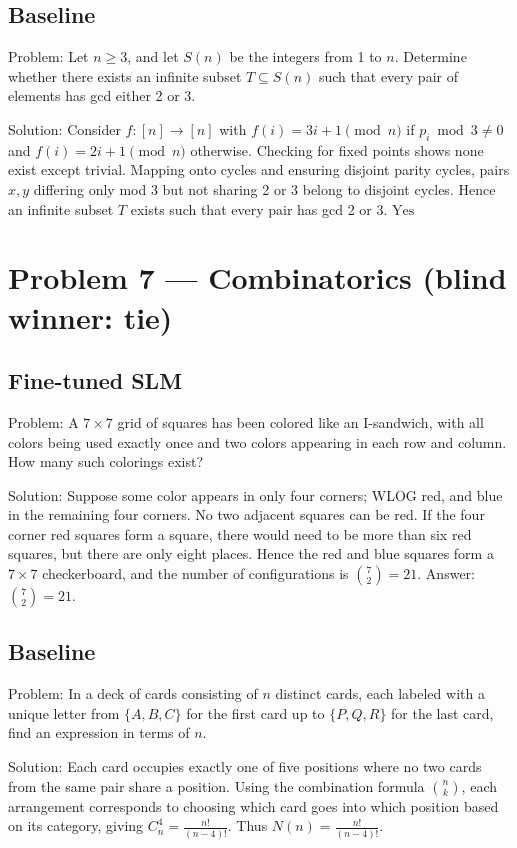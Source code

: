 \documentclass[11pt]{article}
\begin{document}
\subsection*{Baseline}

Problem:
Let $n \geq 3$, and let $S(n)$ be the integers from 1 to $n$. Determine whether there exists an infinite subset $T \subseteq S(n)$ such that every pair of elements has gcd either 2 or 3.

Solution:
Consider $f:[n]\to[n]$ with $f(i)=3i+1 \pmod n$ if $p_i \bmod 3 \ne 0$ and $f(i)=2i+1 \pmod n$ otherwise. Checking for fixed points shows none exist except trivial. Mapping onto cycles and ensuring disjoint parity cycles, pairs $x,y$ differing only mod 3 but not sharing 2 or 3 belong to disjoint cycles. Hence an infinite subset $T$ exists such that every pair has gcd 2 or 3. $\boxed{\text{Yes}}$

\section*{Problem 7 --- Combinatorics \quad(blind winner: tie)}

\subsection*{Fine-tuned SLM}

Problem:
A $7\times7$ grid of squares has been colored like an I-sandwich, with all colors being used exactly once and two colors appearing in each row and column. How many such colorings exist?

Solution:
Suppose some color appears in only four corners; WLOG red, and blue in the remaining four corners. No two adjacent squares can be red. If the four corner red squares form a square, there would need to be more than six red squares, but there are only eight places. Hence the red and blue squares form a $7\times7$ checkerboard, and the number of configurations is $\binom72=21$. Answer: $\binom72=21$.

\subsection*{Baseline}

Problem:
In a deck of cards consisting of $n$ distinct cards, each labeled with a unique letter from $\{A,B,C\}$ for the first card up to $\{P,Q,R\}$ for the last card, find an expression in terms of $n$.

Solution:
Each card occupies exactly one of five positions where no two cards from the same pair share a position. Using the combination formula $\binom nk$, each arrangement corresponds to choosing which card goes into which position based on its category, giving $C_n^4 = \frac{n!}{(n-4)!}$. Thus $N(n)=\frac{n!}{(n-4)!}$.
\end{document}
